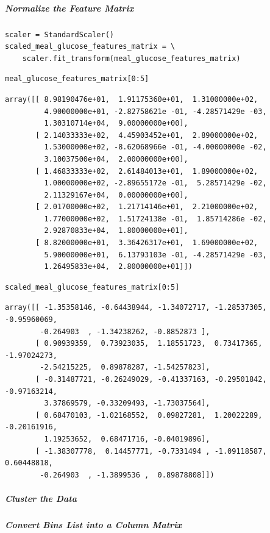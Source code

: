 \subparagraph{Normalize the Feature Matrix}

\begin{verbatim}
scaler = StandardScaler()
scaled_meal_glucose_features_matrix = \
    scaler.fit_transform(meal_glucose_features_matrix)
\end{verbatim}

\begin{verbatim}
meal_glucose_features_matrix[0:5]
\end{verbatim}

\begin{verbatim}
array([[ 8.98190476e+01,  1.91175360e+01,  1.31000000e+02,
         4.90000000e+01, -2.82758621e -01, -4.28571429e -03,
         1.30310714e+04,  9.00000000e+00],
       [ 2.14033333e+02,  4.45903452e+01,  2.89000000e+02,
         1.53000000e+02, -8.62068966e -01, -4.00000000e -02,
         3.10037500e+04,  2.00000000e+00],
       [ 1.46833333e+02,  2.61484013e+01,  1.89000000e+02,
         1.00000000e+02, -2.89655172e -01,  5.28571429e -02,
         2.11329167e+04,  0.00000000e+00],
       [ 2.01700000e+02,  1.21714146e+01,  2.21000000e+02,
         1.77000000e+02,  1.51724138e -01,  1.85714286e -02,
         2.92870833e+04,  1.80000000e+01],
       [ 8.82000000e+01,  3.36426317e+01,  1.69000000e+02,
         5.90000000e+01,  6.13793103e -01, -4.28571429e -03,
         1.26495833e+04,  2.80000000e+01]])
\end{verbatim}

\begin{verbatim}
scaled_meal_glucose_features_matrix[0:5]
\end{verbatim}

\begin{verbatim}
array([[ -1.35358146, -0.64438944, -1.34072717, -1.28537305, -0.95960069,
        -0.264903  , -1.34238262, -0.8852873 ],
       [ 0.90939359,  0.73923035,  1.18551723,  0.73417365, -1.97024273,
        -2.54215225,  0.89878287, -1.54257823],
       [ -0.31487721, -0.26249029, -0.41337163, -0.29501842, -0.97163214,
         3.37869579, -0.33209493, -1.73037564],
       [ 0.68470103, -1.02168552,  0.09827281,  1.20022289, -0.20161916,
         1.19253652,  0.68471716, -0.04019896],
       [ -1.38307778,  0.14457771, -0.7331494 , -1.09118587,  0.60448818,
        -0.264903  , -1.3899536 ,  0.89878808]])
\end{verbatim}

\subparagraph{Cluster the Data}

\subparagraph{Convert Bins List into a Column Matrix}

